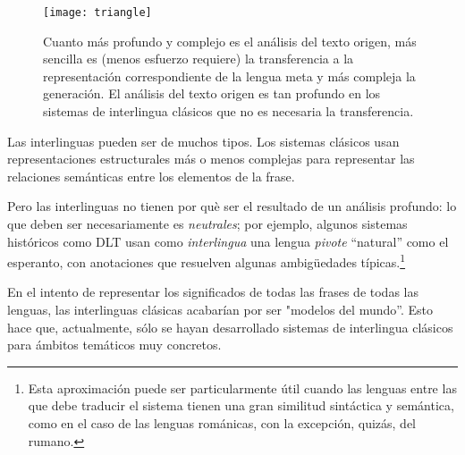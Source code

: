 \begin{figure} \begin{center} \texttt{[image: triangle]} \end{center} \caption{Cuanto más profundo y complejo es el análisis del texto origen, más sencilla es (menos esfuerzo requiere) la transferencia a la representación correspondiente de la lengua meta y más compleja la generación. El análisis del texto origen es tan profundo en los sistemas de interlingua clásicos que no es necesaria la transferencia.} \label{fg:triangle} \end{figure} 

Las interlinguas pueden ser de muchos tipos. Los sistemas clásicos usan representaciones estructurales más o menos complejas para representar las relaciones semánticas entre los elementos de la frase. 

Pero las interlinguas no tienen por què ser el resultado de un análisis profundo: lo que deben ser necesariamente es \emph{neutrales}; por ejemplo, algunos sistemas históricos como DLT \citep[cap.~17]{hutchins92b} usan como \emph{interlingua} una lengua \emph{pivote} ``natural'' como el esperanto, con anotaciones que resuelven algunas ambigüedades típicas.\footnote{Esta aproximación puede ser particularmente útil cuando las lenguas entre las que debe traducir el sistema tienen una gran similitud sintáctica y semántica, como en el caso de las lenguas románicas, con la excepción, quizás, del rumano.} 

En el intento de representar los significados de todas las frases de todas las lenguas, las interlinguas clásicas acabarían por ser "modelos del mundo''. Esto hace que, actualmente, sólo se hayan desarrollado sistemas de interlingua clásicos para ámbitos temáticos muy concretos. 

